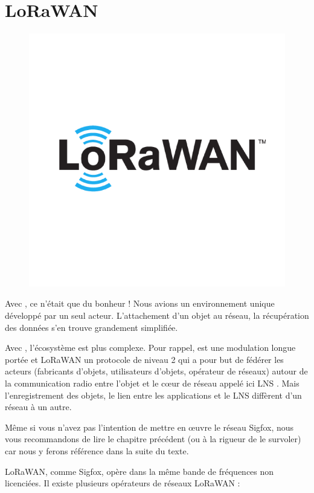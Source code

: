\chapter{LoRaWAN}


\begin{figure}
\includegraphics[width=.3\columnwidth]{Pictures/LORAWAN-logo.png}
\end{figure}


Avec , ce n’était que du bonheur ! Nous avions un environnement unique développé par un seul acteur. L’attachement d’un objet au réseau, la récupération des données s’en trouve grandement simplifiée.

Avec , l'écosystème est plus complexe. Pour rappel,  est une modulation longue portée et LoRaWAN un protocole de niveau 2 qui a pour but de fédérer les acteurs (fabricants d’objets, utilisateurs d’objets, opérateur de réseaux) autour de la communication radio entre l’objet et le cœur de réseau appelé ici \ac{LNS} . Mais l’enregistrement des objets, le lien entre les applications et le LNS diffèrent d’un réseau à un autre.

     \vspace{1em}

Même si vous n’avez pas l’intention de mettre en œuvre le réseau Sigfox, nous vous recommandons de lire le chapitre précédent (ou à la rigueur de le survoler) car nous y ferons référence dans la suite du texte.

     \vspace{1em}

LoRaWAN, comme Sigfox, opère dans la même bande de fréquences non licenciées. Il existe plusieurs opérateurs de réseaux LoRaWAN :

